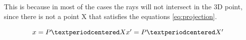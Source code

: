This is because in most of the cases the rays will not intersect in the 3D point, since there is not a point X that satisfies the equations \ref{eq:projection}. 

\begin{equation}
	\centering
	x  = P·X  $$\\
	x' = P·X' $$
	\label{eq:projection}
\end{equation} 


 









  